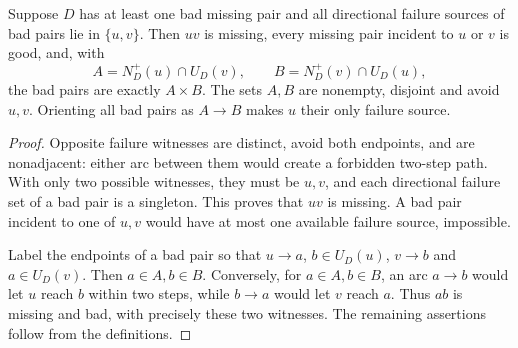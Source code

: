 \begin{lemma}\label{lem:two-source-bipartite-bad}
Suppose $D$ has at least one bad missing pair and all directional
failure sources of bad pairs lie in $\{u,v\}$.
Then $uv$ is missing, every missing pair incident to $u$ or $v$
is good, and, with
\[
 A=N_D^+(u)\cap U_D(v),\qquad B=N_D^+(v)\cap U_D(u),
\]
the bad pairs are exactly $A\times B$.
The sets $A,B$ are nonempty, disjoint and avoid $u,v$.
Orienting all bad pairs as $A\to B$ makes $u$ their only failure source.
\end{lemma}
\begin{proof}
Opposite failure witnesses are distinct, avoid both endpoints,
and are nonadjacent: either arc between them would create a forbidden
two-step path.  With only two possible witnesses, they must be $u,v$,
and each directional failure set of a bad pair is a singleton.
This proves that $uv$ is missing.
A bad pair incident to one of $u,v$ would have at most one available
failure source, impossible.

Label the endpoints of a bad pair so that $u\to a$, $b\in U_D(u)$,
$v\to b$ and $a\in U_D(v)$.  Then $a\in A,b\in B$.
Conversely, for $a\in A,b\in B$, an arc $a\to b$ would let $u$
reach $b$ within two steps, while $b\to a$ would let $v$ reach $a$.
Thus $ab$ is missing and bad, with precisely these two witnesses.
The remaining assertions follow from the definitions.
\end{proof}

